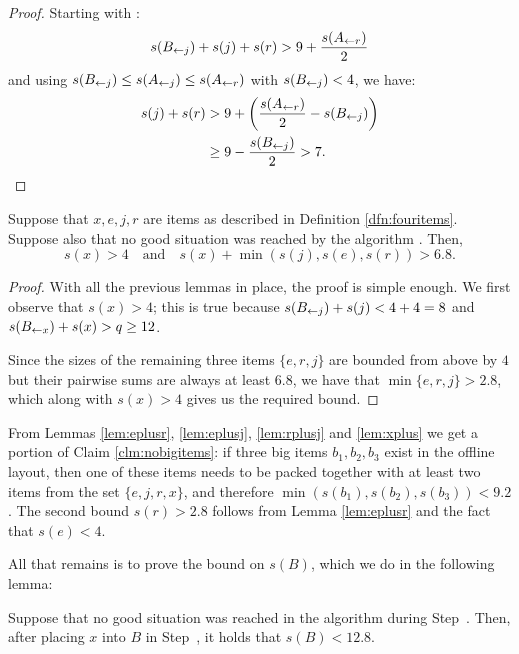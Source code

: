\begin{proof} %
Starting with :
\[ s(B_{\leftarrow j}) + s(j) + s(r) > 9 + \frac{s(A_{\leftarrow r})}{2}  \]
and using $s(B_{\leftarrow j})\le s(A_{\leftarrow j})\le s(A_{\leftarrow r})$ with $s(B_{\leftarrow j}) < 4$, we have:
\begin{align*}
s(j) + s(r) &> 9 + \left( \frac{s(A_{\leftarrow r})}{2} - s(B_{\leftarrow j}) \right) \\
            & \ge  9 - \frac{s(B_{\leftarrow j})}{2} > 7. \qquad 
\end{align*}
\end{proof}

\begin{lem}\label{lem:xplus}
Suppose that $x,e,j,r$ are items as described in Definition \ref{dfn:fouritems}.
Suppose also that no good situation was reached by the algorithm \tbalg.
Then,
\[ s(x) > 4 \quad \text{and} \quad s(x) + \min(s(j),s(e),s(r)) > 6.8. \]
\end{lem}

\begin{proof}
With all the previous lemmas in place, the proof is simple enough. We first
observe that $s(x) > 4$; this is true because $s(B_{\leftarrow j}) + s(j) < 4+4 = 8$ and
$s(B_{\leftarrow x}) + s(x) > q \geq 12$.

Since the sizes of the remaining three items $\{e,r,j\}$ are bounded from above
by $4$ but their pairwise sums are always at least $6.8$, we have
that $\min\{e,r,j\} > 2.8$, which along with $s(x) > 4$ gives us the
required bound.
\end{proof}

From Lemmas \ref{lem:eplusr}, \ref{lem:eplusj}, \ref{lem:rplusj} and
\ref{lem:xplus} we get a portion of Claim \ref{clm:nobigitems}: if
three big items $b_1, b_2, b_3$ exist in the offline layout, then one of these
items needs to be packed together with at least two items from the set
$\{e,j,r,x\}$, and therefore $\min(s(b_1),s(b_2),s(b_3)) < 9.2$. The
second bound $s(r) > 2.8$ follows from Lemma \ref{lem:eplusr} and the
fact that $s(e) < 4$.

All that remains is to prove the bound on $s(B)$, which we do in the following lemma:

\begin{lem}\label{lem:boundonB}
Suppose that no good situation was reached in the algorithm \tbalg during Step~{\rm {}}.
Then, after pla\-cing $x$ into $B$ in Step~{\rm {}}, it holds that $s(B) < 12.8$.
\end{lem}

